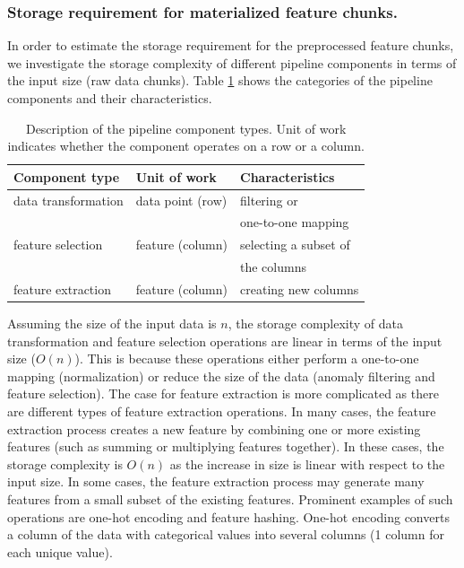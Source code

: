 \subsubsection{Storage requirement for materialized feature chunks.} 
In order to estimate the storage requirement for the preprocessed feature chunks, we investigate the storage complexity of different pipeline components in terms of the input size (raw data chunks).
Table \ref{pipeline-component-description} shows the categories of the pipeline components and their characteristics.
\begin{table}[h!]
\centering
\begin{tabular}{lll}
\hline
\textbf{Component type}  & \textbf{Unit of work} &\textbf{Characteristics}  \\
\hline
data transformation			& data point (row)       	  & filtering or        \\
			&  	  &  one-to-one mapping        \\
feature selection            & feature (column)             & selecting a subset of   \\
			&  	  &   the columns        \\
feature extraction & feature (column) & creating new columns \\
\hline
\end{tabular}
\caption{Description of the pipeline component types. Unit of work indicates whether the component operates on a row or a column.}  
 \vspace{-28pt}
\label{pipeline-component-description}
\end{table}
Assuming the size of the input data is $n$, the storage complexity of data transformation and feature selection operations are linear in terms of the input size ($O(n)$).
This is because these operations either perform a one-to-one mapping (normalization) or reduce the size of the data (anomaly filtering and feature selection).
The case for feature extraction is more complicated as there are different types of feature extraction operations.
In many cases, the feature extraction process creates a new feature by combining one or more existing features (such as summing or multiplying features together).
In these cases, the storage complexity is $O(n)$ as the increase in size is linear with respect to the input size.
In some cases, the feature extraction process may generate many features from a small subset of the existing features.
Prominent examples of such operations are one-hot encoding and feature hashing.
One-hot encoding converts a column of the data with categorical values into several columns (1 column for each unique value).
